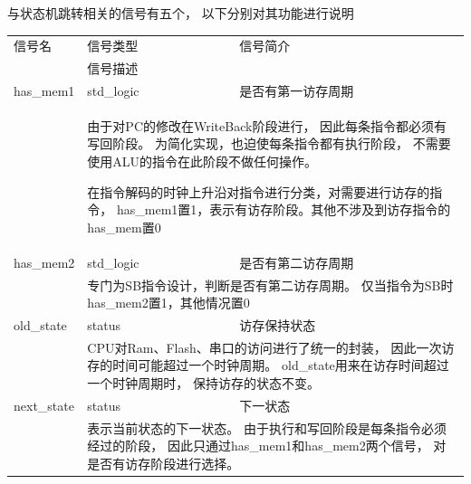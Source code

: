             与状态机跳转相关的信号有五个，%
            以下分别对其功能进行说明

            \begin{tabularx}{\textwidth}{lll}
                \toprule
                信号名          & 信号类型  & 信号简介 \\
                \cmidrule(l){2-3}
                &
                \multicolumn{2}{X}{信号描述} \\
                \midrule
                has\_mem1             & std\_logic        & 是否有第一访存周期 \\
                \cmidrule(l){2-3}
                &
                \multicolumn{2}{X}{
                    由于对PC的修改在WriteBack阶段进行，%
                    因此每条指令都必须有写回阶段。%
                    为简化实现，也迫使每条指令都有执行阶段，%
                    不需要使用ALU的指令在此阶段不做任何操作。

                    在指令解码的时钟上升沿对指令进行分类，对需要进行访存的指令，%
                    has\_mem1置1，表示有访存阶段。其他不涉及到访存指令的has\_mem置0
                } \\
                \midrule
                has\_mem2             & std\_logic        & 是否有第二访存周期 \\
                \cmidrule(l){2-3}
                &
                \multicolumn{2}{X}{
                    专门为SB指令设计，判断是否有第二访存周期。%
                    仅当指令为SB时has\_mem2置1，其他情况置0
                } \\
                \midrule
                old\_state             & status        & 访存保持状态 \\
                \cmidrule(l){2-3}
                &
                \multicolumn{2}{X}{
                    CPU对Ram、Flash、串口的访问进行了统一的封装，%
                    因此一次访存的时间可能超过一个时钟周期。%
                    old\_state用来在访存时间超过一个时钟周期时，%
                    保持访存的状态不变。
                } \\
                \midrule
                next\_state             & status        & 下一状态 \\
                \cmidrule(l){2-3}
                &
                \multicolumn{2}{X}{
                    表示当前状态的下一状态。%
                    由于执行和写回阶段是每条指令必须经过的阶段，%
                    因此只通过has\_mem1和has\_mem2两个信号，%
                    对是否有访存阶段进行选择。

}
\end{tabularx}
